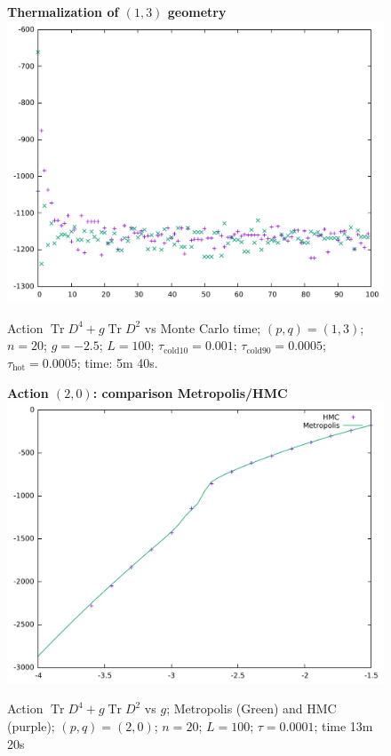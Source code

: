 \documentclass[12pt,a4paper]{article}
\DeclareMathOperator{\Tr}{Tr}
\begin{document}
\begin{figure}[!htb]
\centering
\textbf{Thermalization of $(1,3)$ geometry}
\includegraphics[width=1\linewidth]{p1q3n20g25.pdf}
\caption{Action $\Tr D^4 + g\Tr D^2$ vs Monte Carlo time; $(p,q)=(1,3)$; $n=20$; $g=-2.5$; $L=100$; $\tau_\text{cold10} = 0.001$; $\tau_\text{cold90} = 0.0005$; $\tau_\text{hot} = 0.0005$; time: 5m 40s.}
\end{figure}

\begin{figure}[!htb]
\centering
\textbf{Action $(2,0)$: comparison Metropolis/HMC}
\includegraphics[width=1\linewidth]{p2q0n20S.pdf}
\caption{Action $\Tr D^4 + g\Tr D^2$ vs $g$; Metropolis (Green) and HMC (purple); $(p,q)=(2,0)$; $n=20$; $L=100$; $\tau = 0.0001$; time 13m 20s}
\end{figure}
\end{document}
